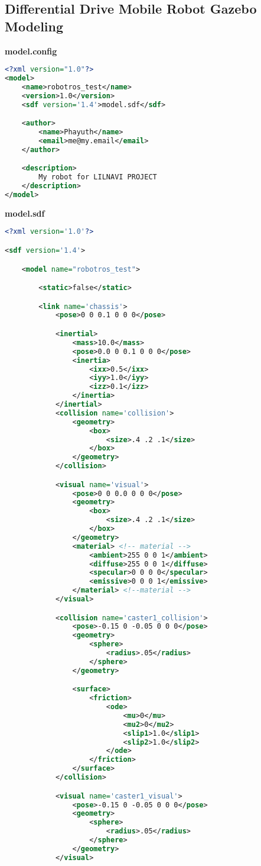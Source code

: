\begin{appendices}
\section{Differential Drive Mobile Robot Gazebo Modeling}

\textbf{model.config}
\begin{lstlisting}[language=XML]
<?xml version="1.0"?>
<model>
	<name>robotros_test</name>
	<version>1.0</version>
	<sdf version='1.4'>model.sdf</sdf>

	<author>
		<name>Phayuth</name>
		<email>me@my.email</email>
	</author>

	<description>
		My robot for LILNAVI PROJECT
	</description>
</model>
\end{lstlisting}


\textbf{model.sdf}
\begin{lstlisting}[language=XML]
<?xml version='1.0'?>

<sdf version='1.4'>

	<model name="robotros_test">

		<static>false</static>

		<link name='chassis'>
			<pose>0 0 0.1 0 0 0</pose>

			<inertial>
				<mass>10.0</mass>
				<pose>0.0 0 0.1 0 0 0</pose>
				<inertia>
					<ixx>0.5</ixx>
					<iyy>1.0</iyy>
					<izz>0.1</izz>
				</inertia>
			</inertial>
			<collision name='collision'>
				<geometry>
					<box>
						<size>.4 .2 .1</size>
					</box>
				</geometry>
			</collision>

			<visual name='visual'>
				<pose>0 0 0.0 0 0 0</pose>
				<geometry>
					<box>
						<size>.4 .2 .1</size>
					</box>
				</geometry>
				<material> <!-- material -->
					<ambient>255 0 0 1</ambient>
					<diffuse>255 0 0 1</diffuse>
					<specular>0 0 0 0</specular>
					<emissive>0 0 0 1</emissive>
				</material> <!--material -->
			</visual>

			<collision name='caster1_collision'>
				<pose>-0.15 0 -0.05 0 0 0</pose>
				<geometry>
					<sphere>
						<radius>.05</radius>
					</sphere>
				</geometry>

				<surface>
					<friction>
						<ode>
							<mu>0</mu>
							<mu2>0</mu2>
							<slip1>1.0</slip1>
							<slip2>1.0</slip2>
						</ode>
					</friction>
				</surface>
			</collision>

			<visual name='caster1_visual'>
				<pose>-0.15 0 -0.05 0 0 0</pose>
				<geometry>
					<sphere>
						<radius>.05</radius>
					</sphere>
				</geometry>
			</visual>


\end{lstlisting}
\end{appendices}
